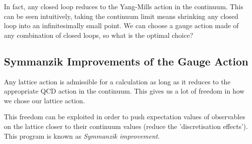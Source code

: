
In fact, any closed loop reduces to the Yang-Mills action in the continuum. This can be seen intuitively, taking the continuum limit means shrinking any closed loop into an infinitesimally small point. We can choose a gauge action made of any combination of closed loops, so what is the optimal choice?

\subsection{Symmanzik Improvements of the Gauge Action}
\label{sec:symmanzik_gauge}

Any lattice action is admissible for a calculation as long as it reduces to the appropriate QCD action in the continuum. This gives us a lot of freedom in how we chose our lattice action. %

This freedom can be exploited in order to push expectation values of observables on the lattice closer to their continuum values (reduce the 'discretisation effects'). %
This program is known as {\it{Symmanzik improvement}}.

